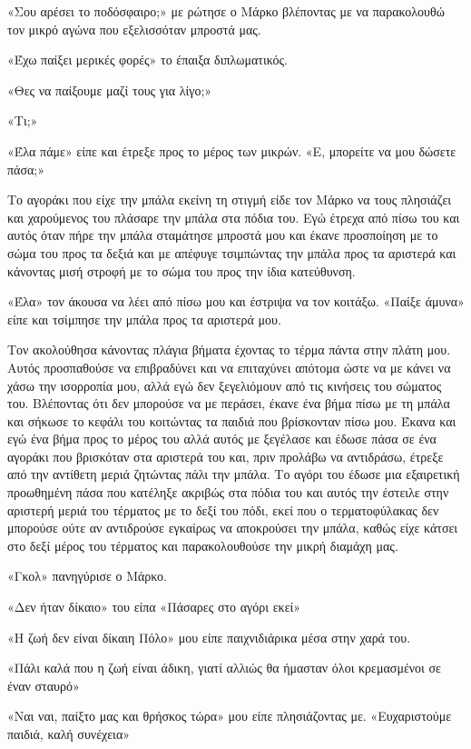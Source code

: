 \documentclass[12pt,twoside, openany]{book}
\begin{document}
«Σου αρέσει το ποδόσφαιρο;» με ρώτησε ο Μάρκο βλέποντας με να παρακολουθώ τον μικρό αγώνα που εξελισσόταν μπροστά μας.

«Έχω παίξει μερικές φορές» το έπαιξα διπλωματικός.

«Θες να παίξουμε μαζί τους για λίγο;»

«Τι;»

«Έλα πάμε» είπε και έτρεξε προς το μέρος των μικρών. «Ε, μπορείτε να μου δώσετε πάσα;»

Το αγοράκι που είχε την μπάλα εκείνη τη στιγμή είδε τον Μάρκο να τους πλησιάζει και χαρούμενος του πλάσαρε την μπάλα στα πόδια του. Εγώ έτρεχα από πίσω του και αυτός όταν πήρε την μπάλα σταμάτησε μπροστά μου και έκανε προσποίηση με το σώμα του προς τα δεξιά και με απέφυγε τσιμπώντας την μπάλα προς τα αριστερά και κάνοντας μισή στροφή με το σώμα του προς την ίδια κατεύθυνση.

«Έλα» τον άκουσα να λέει από πίσω μου και έστριψα να τον κοιτάξω. «Παίξε άμυνα» είπε και τσίμπησε την μπάλα προς τα αριστερά μου.

Τον ακολούθησα κάνοντας πλάγια βήματα έχοντας το τέρμα πάντα στην πλάτη μου. Αυτός προσπαθούσε να επιβραδύνει και να επιταχύνει απότομα ώστε να με κάνει να χάσω την ισορροπία μου, αλλά εγώ δεν ξεγελιόμουν από τις κινήσεις του σώματος του. Βλέποντας ότι δεν μπορούσε να με περάσει, έκανε ένα βήμα πίσω με τη μπάλα και σήκωσε το κεφάλι του κοιτώντας τα παιδιά που βρίσκονταν πίσω μου. Έκανα και εγώ ένα βήμα προς το μέρος του αλλά αυτός με ξεγέλασε και έδωσε πάσα σε ένα αγοράκι που βρισκόταν στα αριστερά του και, πριν προλάβω να αντιδράσω, έτρεξε από την αντίθετη μεριά ζητώντας πάλι την μπάλα. Το αγόρι του έδωσε μια εξαιρετική προωθημένη πάσα που κατέληξε ακριβώς στα πόδια του και αυτός την έστειλε στην αριστερή μεριά του τέρματος με το δεξί του πόδι, εκεί που ο τερματοφύλακας δεν μπορούσε ούτε αν αντιδρούσε εγκαίρως να αποκρούσει την μπάλα, καθώς είχε κάτσει στο δεξί μέρος του τέρματος και παρακολουθούσε την μικρή διαμάχη μας.

«Γκολ» πανηγύρισε ο Μάρκο.

«Δεν ήταν δίκαιο» του είπα «Πάσαρες στο αγόρι εκεί»

«Η ζωή δεν είναι δίκαιη Πόλο» μου είπε παιχνιδιάρικα μέσα στην χαρά του.

«Πάλι καλά που η ζωή είναι άδικη, γιατί αλλιώς θα ήμασταν όλοι κρεμασμένοι σε έναν σταυρό»

«Ναι ναι, παίξτο μας και θρήσκος τώρα» μου είπε πλησιάζοντας με. «Ευχαριστούμε παιδιά, καλή συνέχεια»
\end{document}

